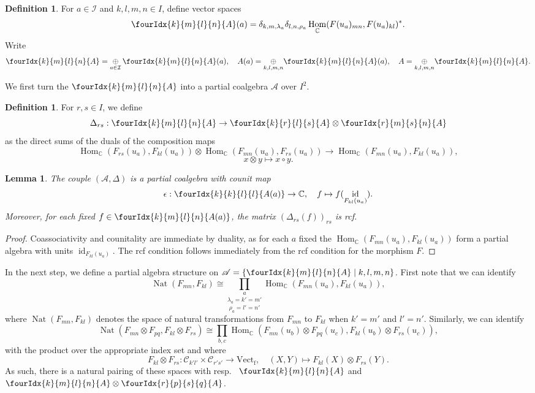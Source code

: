 \documentclass[10pt]{article}
\DeclareMathOperator{\fin}{\mathrm{f}}
\DeclareMathOperator{\id}{id}
\DeclareMathOperator{\Hom}{Hom}
\DeclareMathOperator{\Nat}{\mathrm{Nat}}
\newcommand{\C}{\mathbb{C}}
\newcommand{\CatC}{\mathcal{C}}
\newcommand{\Vect}{\mathrm{Vect}}
\newcommand{\Gr}[5]{\fourIdx{#2}{#4}{#3}{#5}{#1}}%
\newtheorem{Lem}[Theorem]{Lemma}
\theoremstyle{definition}
\newtheorem{Def}[Theorem]{Definition}
\numberwithin{equation}{section}
\begin{document}
\begin{Def} For $a\in \mathcal{I}$ and $k,l,m,n\in I$, define vector spaces \[\Gr{A}{k}{l}{m}{n}(a) =  \delta_{k,m,\lambda_a}\delta_{l,n,\rho_a} \Hom_{\C}(F(u_a)_{mn},F(u_a)_{kl})^*.\] Write \[\Gr{A}{k}{l}{m}{n} =\underset{a\in \mathcal{I}}{\oplus}\, \Gr{A}{k}{l}{m}{n}(a),\quad A(a) = \underset{k,l,m,n}{\oplus} \Gr{A}{k}{l}{m}{n}(a),\quad A = \underset{k,l,m,n}{\oplus} \Gr{A}{k}{l}{m}{n}.\] 
\end{Def} 

We first turn the $\Gr{A}{k}{l}{m}{n}$ into a partial coalgebra $\mathscr{A}$ over $I^2$.

\begin{Def} For $r,s\in I$, we define \[\Delta_{rs}: \Gr{A}{k}{l}{m}{n}\rightarrow \Gr{A}{k}{l}{r}{s}\otimes \Gr{A}{r}{s}{m}{n}\] as the direct sums of the duals of the composition maps \[\Hom_{\C}(F_{rs}(u_a),F_{kl}(u_a)) \otimes \Hom_{\C}(F_{mn}(u_a),F_{rs}(u_a))\rightarrow \Hom_{\C}(F_{mn}(u_a),F_{kl}(u_a)),\]\[x\otimes y \mapsto x\circ y.\]
\end{Def} 

\begin{Lem} The couple $(\mathscr{A},\Delta)$ is a partial coalgebra with counit map \[\epsilon:\Gr{A(a)}{k}{l}{k}{l}\rightarrow \C,\quad f\mapsto f(\id_{F_{kl}(u_a)}).\] Moreover, for each fixed $f\in \Gr{A(a)}{k}{l}{m}{n}$, the matrix $\left(\Delta_{rs}(f)\right)_{rs}$ is rcf.
\end{Lem} 
\begin{proof} Coassociativity and counitality are immediate by duality, as for each $a$ fixed the $\Hom_{\C}(F_{mn}(u_a),F_{kl}(u_a))$ form a partial algebra with units $\id_{F_{kl}(u_a)}$. The rcf condition follows immediately from the rcf condition for the morphism $F$.
\end{proof}

In the next step, we define a partial algebra structure on $\mathscr{A} = \{\Gr{A}{k}{l}{m}{n}\mid k,l,m,n\}$. First note that we can identify \[\Nat(F_{mn},F_{kl}) \cong \underset{\rho_a=l'=n'}{\underset{\lambda_a=k'=m'}{\prod_a}} \Hom_{\C}(F_{mn}(u_a),F_{kl}(u_a)),\] where $\Nat(F_{mn},F_{kl})$ denotes the space of natural transformations from $F_{mn}$ to $F_{kl}$ when $k'=m'$ and $l'=n'$. Similarly, we can identify \[\Nat(F_{mn}\otimes F_{pq},F_{kl}\otimes F_{rs}) \cong  \prod_{b,c} \Hom_{\C}(F_{mn}(u_b)\otimes F_{pq}(u_c) ,F_{kl}(u_b)\otimes F_{rs}(u_c)),\] with the product over the appropriate index set and where \[F_{kl}\otimes F_{rs}:\CatC_{k'l'}\times \CatC_{r's'}\rightarrow \Vect_{\fin},\quad (X,Y) \mapsto F_{kl}(X)\otimes F_{rs}(Y).\] As such, there is a natural pairing of these spaces with resp.~ $\Gr{A}{k}{l}{m}{n}$ and $\Gr{A}{k}{l}{m}{n}\otimes \Gr{A}{r}{s}{p}{q}$. 
\end{document}
